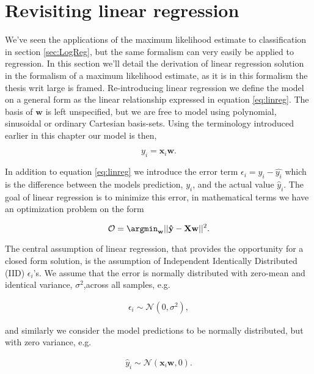 \section{Revisiting linear regression}

We've seen the applications of the maximum likelihood estimate to classification in section \ref{sec:LogReg}, but the same formalism can very easily be applied to regression. In this section we'll detail the derivation of linear regression solution in the formalism of a maximum likelihood estimate, as it is in this formalism the thesis writ large is framed. Re-introducing linear regression we define the model on a general form as the linear relationship expressed in equation \ref{eq:linreg}. The basis of $\mathbf{w}$ is left unspecified, but we are free to model using polynomial, sinusoidal or ordinary Cartesian basis-sets. Using the terminology introduced earlier in this chapter our model is then, 

\begin{equation}\label{eq:linreg}
y_i = \mathbf{x}_i\mathbf{w}.
\end{equation}

\noindent In addition to equation \ref{eq:linreg} we introduce the error term $\epsilon_i= y_i - \hat{y_i}$ which is the difference between the models prediction, $y_i$, and the actual value $\hat{y}_i$. The goal of linear regression is to minimize this error, in mathematical terms we have an optimization problem on the form

\begin{equation}
\mathcal{O} = \argmin _{\mathbf{w}} || \mathbf{\hat{y}} - \mathbf{Xw} ||^2.
\end{equation}

\noindent The central assumption of linear regression, that provides the opportunity for a closed form solution, is the assumption of Independent Identically Distributed (IID) $\epsilon_i$'s. We assume that the error is normally distributed with zero-mean and identical variance, $\sigma^2$,across all samples, e.g. 

\begin{align}
\epsilon_i \sim \mathcal{N}(0, \sigma^2),
\end{align}

\noindent and similarly we consider the model predictions to be normally distributed, but with zero variance, e.g.

\begin{align}
\hat{y}_i \sim \mathcal{N}(\mathbf{x}_i\mathbf{w}, 0).
\end{align}

